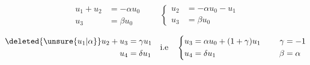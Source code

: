 
\[
\begin{aligned}u_1+u_2&=-\alpha u_0\\u_3&=\beta u_0\end{aligned}
\qquad\left\{\begin{aligned}u_2&=-\alpha u_0-u_1\\u_3&=\beta u_0\end{aligned}\right.
\]

\[
\begin{aligned}\deleted{\unsure{u_1|\alpha}}u_2+u_3&=\gamma u_1\\u_4&=\delta u_1\end{aligned}
\quad\text{i.e}\quad
\left\{\begin{aligned}u_3&=\alpha u_0+(1+\gamma)u_1\\u_4&=\delta u_1\end{aligned}\right.
\qquad\begin{aligned}\gamma&=-1\\\beta&=\alpha\end{aligned}
\]

